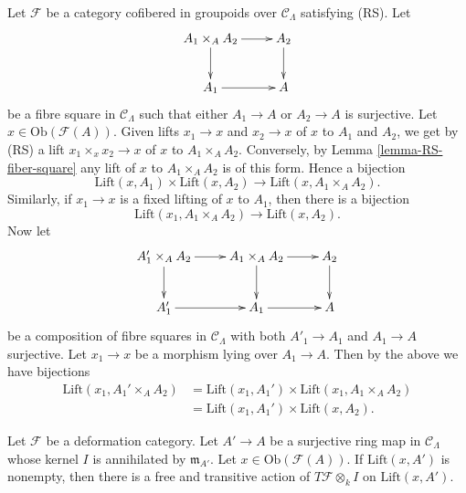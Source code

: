\begin{remark}
\label{remark-lift-bijections}
Let $\mathcal{F}$ be a category cofibered in groupoids over $\mathcal 
C_\Lambda$ satisfying (RS).  Let
$$
\xymatrix{ 
A_1 \times_{A} A_2 \ar[r] \ar[d] & A_2 \ar[d] \\
A_1 \ar[r] & A
}
$$
be a fibre square in $\mathcal{C}_\Lambda$ such that either
$A_1 \to A$ or $A_2 \to A$ is surjective. Let
$x \in \text{Ob}(\mathcal{F}(A))$. Given
lifts $x_1 \to x$ and $x_2 \to x$ of $x$ to $A_1$ and $A_2$, we get by 
(RS) a lift $x_1 \times_{x} x_2 \to x$ of $x$ to $A_1 \times_{A} A_2$. 
Conversely, by
Lemma \ref{lemma-RS-fiber-square}
any lift of $x$ to $A_1 \times_A A_2$ is of this form.
Hence a bijection
$$
\text{Lift}(x,A_1) \times \text{Lift}(x,A_2)
\longrightarrow
\text{Lift}(x, A_1 \times_{A} A_2).
$$
Similarly, if $x_1 \to x$ is a fixed lifting of $x$ to $A_1$, then 
there is a bijection
$$
\text{Lift}(x_1, A_1 \times_{A} A_2)
\longrightarrow
\text{Lift}(x, A_2).
$$
Now let
$$
\xymatrix{
A_1' \times_{A} A_2 \ar[r] \ar[d] & A_1 \times_{A} A_2 \ar[r] \ar[d] & A_2 
\ar[d] \\
A_1' \ar[r] & A_1 \ar[r] & A
}
$$
be a composition of fibre squares in $\mathcal{C}_\Lambda$ with
both $A'_1 \to A_1$ and $A_1 \to A$ surjective. Let $x_1 \to x$ be a morphism
lying over $A_1 \to A$. Then by the above we have bijections
\begin{align*}
\text{Lift}(x_1,A_1' \times_{A} A_2)
& = \text{Lift}(x_1,A_1') \times \text{Lift}(x_1, A_1 \times_{A} A_2) \\
& = \text{Lift}(x_1,A_1') \times \text{Lift}(x, A_2).
\end{align*}
\end{remark}

\begin{lemma}
\label{lemma-free-transitive-action}
Let $\mathcal{F}$ be a deformation category.
Let $A' \to A$ be a surjective ring map in
$\mathcal{C}_\Lambda$ whose kernel $I$ is annihilated
by $\mathfrak m_{A'}$. Let $x \in \text{Ob}(\mathcal{F}(A))$.
If $\text{Lift}(x, A')$ is nonempty,
then there is a free and transitive action of
$T\mathcal{F} \otimes_k I$ on $\text{Lift}(x, A')$.
\end{lemma}


